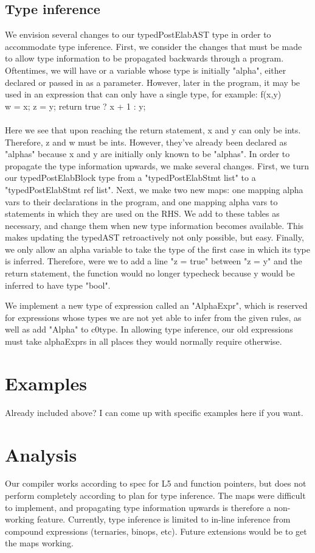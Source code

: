 \documentclass{article}
\begin{document}
\subsection{Type inference}
We envision several changes to our typedPostElabAST type in order to accommodate type inference. First, we consider the changes that must be made to allow type information to be propagated backwards through a program. Oftentimes, we will have or a variable whose type is initially "alpha", either declared or passed in as a parameter. However, later in the program, it may be used in an expression that can only have a single type, for example:
f(x,y) {\\
  w = x;
  z = y;
  return true ? x + 1 : y; \\
} \\
Here we see that upon reaching the return statement, x and y can only be ints. Therefore, z and w must be ints. However, they've already been declared as "alphas" because x and y are initially only known to be "alphas". In order to propagate the type information upwards, we make several changes. First, we turn our typedPostElabBlock type from a "typedPostElabStmt list" to a "typedPostElabStmt ref list". Next, we make two new maps: one mapping alpha vars to their declarations in the program, and one mapping alpha vars to statements in which they are used on the RHS. We add to these tables as necessary, and change them when new type information becomes available. This makes updating the typedAST retroactively not only possible, but easy. Finally, we only allow an alpha variable to take the type of the first case in which its type is inferred. Therefore, were we to add a line "z = true" between "z = y" and the return statement, the function would no longer typecheck because y would be inferred to have type "bool".

We implement a new type of expression called an "AlphaExpr", which is reserved for expressions whose types we are not yet able to infer from the given rules, as well as add "Alpha" to c0type. In allowing type inference, our old expressions must take alphaExprs in all places they would normally require otherwise. 

\section{Examples}

Already included above? I can come up with specific examples here if you want.

\section{Analysis}

Our compiler works according to spec for L5 and function pointers, but does not perform completely according to plan for type inference. The maps were difficult to implement, and propagating type information upwards is therefore a non-working feature. Currently, type inference is limited to in-line inference from compound expressions (ternaries, binops, etc). Future extensions would be to get the maps working. 
 
\end{document}
